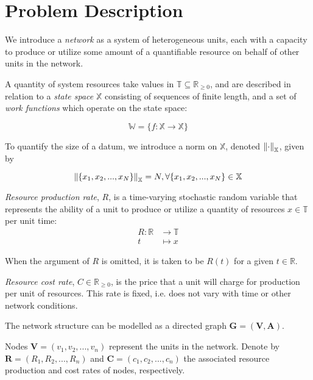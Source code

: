 \documentclass[../mthe-493-project-proposal.tex]{subfiles}
\begin{document}
    \chapter{Problem Description}
    \label{ch:problem-description}
    We introduce a \textit{network} as a system of heterogeneous units, each with a capacity to produce or utilize some amount of a quantifiable resource on behalf of other units in the network.
    
    A quantity of system resources take values in $\mathbb{T} \subseteq \mathbb{R}_{\geq 0}$, and are described in relation to a \textit{state space} $\mathbb{X}$ consisting of sequences of finite length, and a set of \textit{work functions} which operate on the state space:

    \begin{equation*}
        \mathbb{W} = \{f: \mathbb{X} \rightarrow \mathbb{X}\}
    \end{equation*}
    
    To quantify the size of a datum, we introduce a norm on $\mathbb{X}$, denoted $\norm{\cdot}_{\mathbb{X}}$, given by
    
    \begin{equation*}
        \norm{\{x_1, x_2, ..., x_N\}}_{\mathbb{X}} = N, \forall \{x_1, x_2, ..., x_N\} \in \mathbb{X}
    \end{equation*}
    
    \textit{Resource production rate}, $R$, is a time-varying stochastic random variable that represents the ability of a unit to produce or utilize a quantity of resources $x \in \mathbb{T}$ per unit time:
    \begin{align*}
        R \colon \mathbb{R} &\to \mathbb{T} \\
        t &\mapsto x
    \end{align*}
    
    When the argument of $R$ is omitted, it is taken to be $R(t)$ for a given $t \in \mathbb{R}$.
    
    \textit{Resource cost rate}, $C \in \mathbb{R}_{\geq 0}$, is the price that a unit will charge for production per unit of resources. This rate is fixed, i.e. does not vary with time or other network conditions.
    
    The network structure can be modelled as a directed graph $\mathbf{G} = (\mathbf{V}, \mathbf{A})$. 
    
    Nodes $\mathbf{V} = (v_1, v_2, ..., v_n)$ represent the units in the network. Denote by $\mathbf{R} = (R_1, R_2, ..., R_n)$ and $\mathbf{C} = (c_1, c_2, ..., c_n)$ the associated resource production and cost rates of nodes, respectively.
    
\end{document}
